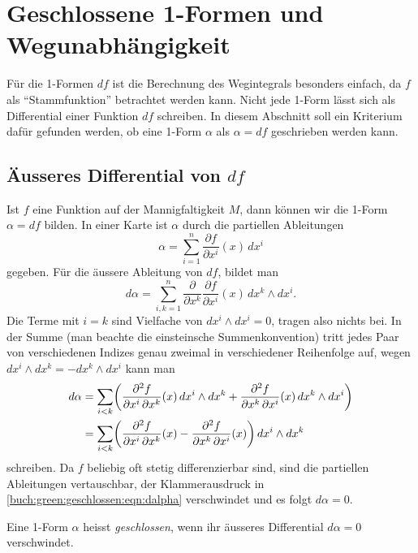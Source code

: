 %
%
\section{Geschlossene 1-Formen und Wegunabhängigkeit
\label{buch:green:section:geschlossen}}
Für die 1-Formen $df$ ist die Berechnung des Wegintegrals besonders
einfach, da $f$ als ``Stammfunktion'' betrachtet werden kann.
Nicht jede 1-Form lässt sich als Differential einer Funktion $df$ 
schreiben.
In diesem Abschnitt soll ein Kriterium dafür gefunden werden, 
ob eine 1-Form $\alpha$ als $\alpha=df$ geschrieben werden kann.

%
%
\subsection{Äusseres Differential von $df$}
Ist $f$ eine Funktion auf der Mannigfaltigkeit $M$, dann können wir
die 1-Form $\alpha = df$ bilden.
In einer Karte ist $\alpha$ durch die partiellen Ableitungen
\[
\alpha
=
\sum_{i=1}^n
\frac{\partial f}{\partial x^i}(x)\,dx^i
\]
gegeben.
Für die äussere Ableitung von $df$, bildet man
\[
d\alpha
=
\sum_{i,k=1}^n
\frac{\partial}{\partial x^k}
\frac{\partial f}{\partial x^i}(x)\,
dx^k
\wedge
dx^i.
\]
Die Terme mit $i=k$ sind Vielfache von $dx^i\wedge dx^i=0$, tragen
also nichts bei.
In der Summe (man beachte die einsteinsche Summenkonvention)
tritt jedes Paar von verschiedenen Indizes genau zweimal in verschiedener
Reihenfolge auf, wegen $dx^i\wedge dx^k = - dx^k \wedge dx^i$ kann man
\begin{align}
d\alpha
&=
\sum_{i < k}
\biggl(
\frac{\partial^2 f}{\partial x^i\,\partial x^k}(x)\, dx^i\wedge dx^k
+
\frac{\partial^2 f}{\partial x^k\,\partial x^i}(x)\, dx^k\wedge dx^i
\biggr)
\notag
\\
&=
\sum_{i < k}
\biggl(
\frac{\partial^2 f}{\partial x^i\,\partial x^k}(x)
-
\frac{\partial^2 f}{\partial x^k\,\partial x^i}(x)
\biggr)
\, dx^i\wedge dx^k
\label{buch:green:geschlossen:eqn:dalpha}
\end{align}
schreiben.
Da $f$ beliebig oft stetig differenzierbar sind, sind die partiellen
Ableitungen vertauschbar, der Klammerausdruck in
\eqref{buch:green:geschlossen:eqn:dalpha}
verschwindet und es folgt $d\alpha = 0$.

\begin{definition}
%
Eine 1-Form $\alpha$ heisst {\em geschlossen}, wenn ihr äusseres
Differential $d\alpha=0$ verschwindet.
\end{definition}

